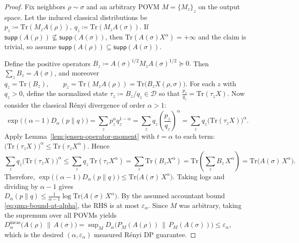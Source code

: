 \documentclass[11pt]{article}
\def\Tr{\mathrm{Tr}}
\def\supp{\mathsf{supp}}
\theoremstyle{plain}
\theoremstyle{remark}
\begin{document}
\begin{proof}
Fix neighbors $\rho\sim\sigma$ and an arbitrary POVM $M=\{M_z\}_z$ on the output space.
Let the induced classical distributions be $
p_z \coloneqq \Tr(M_z A(\rho)),\ q_z \coloneqq \Tr(M_z A(\sigma)).
$
If $\supp(A(\rho))\nsubseteq\supp(A(\sigma))$, then $\Tr(A(\sigma)X^\alpha)=+\infty$ and the claim is
trivial, so assume $\supp(A(\rho))\subseteq\supp(A(\sigma))$.

Define the positive operators
$
B_z \coloneqq A(\sigma)^{1/2} M_z A(\sigma)^{1/2}\succeq 0.
$
Then $\sum_z B_z = A(\sigma)$, and moreover
$
q_z = \Tr(B_z),\qquad p_z = \Tr(M_z A(\rho))=\Tr\!\big(B_z X(\rho,\sigma)\big).
$
For each $z$ with $q_z>0$, define the normalized state $\tau_z \coloneqq B_z/q_z\in\mathcal{D}$ so that
$
\frac{p_z}{q_z}=\Tr(\tau_z X).
$
Now consider the classical R\'enyi divergence of order $\alpha>1$:
\[
\exp\big((\alpha-1)D_\alpha(p\|q)\big)
=
\sum_z p_z^\alpha q_z^{1-\alpha}
=
\sum_z q_z\left(\frac{p_z}{q_z}\right)^\alpha
=
\sum_z q_z\big(\Tr(\tau_z X)\big)^\alpha.
\]
Apply Lemma~\ref{lem:jensen-operator-moment} with $t=\alpha$ to each term:
$
\big(\Tr(\tau_z X)\big)^\alpha \le \Tr(\tau_z X^\alpha).
$
Hence
\[
\sum_z q_z\big(\Tr(\tau_z X)\big)^\alpha
\le
\sum_z q_z\,\Tr(\tau_z X^\alpha)
=
\sum_z \Tr(B_z X^\alpha)
=
\Tr\!\left(\sum_z B_z\,X^\alpha\right)
=
\Tr\!\big(A(\sigma)\,X^\alpha\big).
\]
Therefore,
$
\exp\big((\alpha-1)D_\alpha(p\|q)\big)
\le
\Tr\!\big(A(\sigma)\,X^\alpha\big).
$
Taking logs and dividing by $\alpha-1$ gives \\
$
D_\alpha(p\|q)
\le
\frac{1}{\alpha-1}\log \Tr\!\big(A(\sigma)\,X^\alpha\big).$
By the assumed accountant bound \eqref{eq:qma-bound-at-alpha}, the RHS is at most $\varepsilon_\alpha$.
Since $M$ was arbitrary, taking the supremum over all POVMs yields \\
$
D^{\mathrm{meas}}_\alpha\!\big(A(\rho)\,\|\,A(\sigma)\big)
=
\sup_{M} D_\alpha\!\big(P_M(A(\rho))\,\|\,P_M(A(\sigma))\big)
\le
\varepsilon_\alpha,
$
which is the desired $(\alpha,\varepsilon_\alpha)$ measured R\'enyi DP guarantee.
\end{proof}
\end{document}
